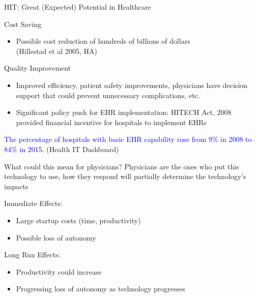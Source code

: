 \documentclass[10pt]{beamer}
\begin{document}
\begin{frame}[fragile]{HIT: Great (Expected) Potential in Healthcare}
\begin{alertblock}{Cost Saving}
\begin{itemize}
    \item Possible cost reduction of hundreds of billions of dollars \\ \scriptsize (Hillestad et al 2005, HA)
\end{itemize}
\end{alertblock}

\begin{alertblock}{Quality Improvement}
\begin{itemize}
    \item Improved efficiency, patient safety improvements, physicians have decision support that could prevent unnecessary complications, etc.
    \item Significant policy push for EHR implementation: HITECH Act, 2008 provided financial incentive for hospitals to implement EHRs 
\end{itemize}
\end{alertblock}

\vspace{4mm}

\textcolor{blue}{The percentage of hospitals with basic EHR capability rose from 9$\%$ in 2008 to 84$\%$ in 2015.} \scriptsize (Health IT Dashboard)


\end{frame}

\begin{frame}[fragile]{What could this mean for physicians?}
Physicians are the ones who put this technology to use, how they respond will partially determine the technology's impacts

\vspace{3mm}


Immediate Effects:
\begin{itemize}
    \item Large startup costs (time, productivity)
    \item Possible loss of autonomy
\end{itemize}

\vspace{4mm}

Long Run Effects:
\begin{itemize}
    \item Productivity could increase
    \item Progressing loss of autonomy as technology progresses
\end{itemize}

\end{frame}
\end{document}
